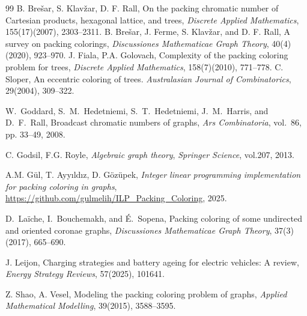 \documentclass{article}
\begin{document}
\begin{thebibliography}{99}
 B. Brešar, S. Klavžar,  D. F. Rall,  On the packing chromatic number of Cartesian products, hexagonal lattice, and trees, \emph{Discrete Applied Mathematics}, 155(17)(2007), 2303--2311.
 B. Brešar, J. Ferme, S. Klavžar, and D. F. Rall,  A survey on packing colorings, \emph{Discussiones Mathematicae Graph Theory}, 40(4)(2020), 923--970.
 J. Fiala, P.A. Golovach, Complexity of the packing coloring problem for trees, \emph{Discrete Applied Mathematics}, 158(7)(2010), 771--778.
 C. Sloper, An eccentric coloring of trees. \emph{Australasian Journal of Combinatorics}, 29(2004), 309--322. 


W.~Goddard, S.~M.~Hedetniemi, S.~T.~Hedetniemi, J.~M.~Harris, and D.~F.~Rall,
Broadcast chromatic numbers of graphs,
\emph{Ars Combinatoria}, vol.~86, pp. 33--49, 2008.

 C. Godsil, F.G. Royle, \emph{Algebraic graph theory}, \emph{Springer Science}, vol.207, 2013.

 A.M. Gül, T. Ayyıldız, D. Gözüpek, \emph{Integer linear programming implementation for packing coloring in graphs}, \url{https://github.com/gulmelih/ILP_Packing_Coloring}, 2025.

D.~La{\"i}che, I.~Bouchemakh, and {\'E}.~Sopena,
Packing coloring of some undirected and oriented coronae graphs,
\emph{Discussiones Mathematicae Graph Theory}, 37(3)(2017), 665--690.

J. Leijon,
Charging strategies and battery ageing for electric vehicles: A review,
\emph{Energy Strategy Reviews}, 57(2025), 101641.

 Z. Shao, A. Vesel, Modeling the packing coloring problem of graphs, \emph{Applied Mathematical Modelling}, 39(2015), 3588--3595.

\end{thebibliography}
\end{document}
